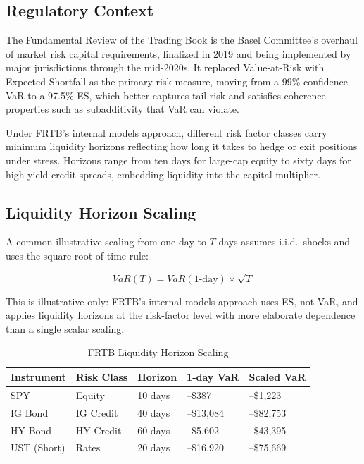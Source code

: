 \documentclass[11pt, a4paper]{article}
\begin{document}
\subsection{Regulatory Context}

The Fundamental Review of the Trading Book is the Basel Committee's overhaul of market risk capital requirements, finalized in 2019 and being implemented by major jurisdictions through the mid-2020s. It replaced Value-at-Risk with Expected Shortfall as the primary risk measure, moving from a 99\% confidence VaR to a 97.5\% ES, which better captures tail risk and satisfies coherence properties such as subadditivity that VaR can violate.

Under FRTB's internal models approach, different risk factor classes carry minimum liquidity horizons reflecting how long it takes to hedge or exit positions under stress. Horizons range from ten days for large-cap equity to sixty days for high-yield credit spreads, embedding liquidity into the capital multiplier.

\subsection{Liquidity Horizon Scaling}

A common illustrative scaling from one day to $T$ days assumes i.i.d.\ shocks and uses the square-root-of-time rule:

\begin{equation}
VaR(T) = VaR(\text{1-day}) \times \sqrt{T}
\end{equation}

This is illustrative only: FRTB's internal models approach uses ES, not VaR, and applies liquidity horizons at the risk-factor level with more elaborate dependence than a single scalar scaling.

\begin{table}[H]
\centering
\caption{FRTB Liquidity Horizon Scaling}
\begin{tabularx}{\textwidth}{lXXXX}
\toprule
\textbf{Instrument} & \textbf{Risk Class} & 
\textbf{Horizon} & \textbf{1-day VaR} & 
\textbf{Scaled VaR} \\
\midrule
SPY & Equity & 10 days & --\$387 & 
--\$1,223 \\
IG Bond & IG Credit & 40 days & --\$13,084 & 
--\$82,753 \\
HY Bond & HY Credit & 60 days & --\$5,602 & 
--\$43,395 \\
UST (Short) & Rates & 20 days & --\$16,920 & 
--\$75,669 \\
\bottomrule
\end{tabularx}
\end{table}
\end{document}
